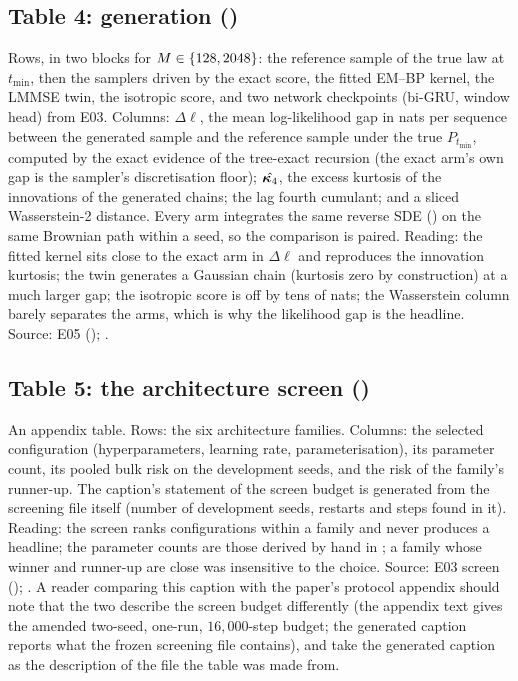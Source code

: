 \subsection{Table 4: generation ()}

Rows, in two blocks for $M\in\{128,2048\}$: the reference sample of the true law at
$t_{\min}$, then the samplers driven by the exact score, the fitted EM--BP kernel, the
LMMSE twin, the isotropic score, and two network checkpoints (bi-GRU, window head) from
E03. Columns: $\Delta\ell$, the mean log-likelihood gap in nats per sequence between the
generated sample and the reference sample under the true $P_{t_{\min}}$, computed by
the exact evidence of the tree-exact recursion (the exact arm's own gap is the sampler's
discretisation floor); $\hat{\bm{\kappa}_4}$, the excess kurtosis of the innovations of the
generated chains; the lag fourth cumulant; and a sliced Wasserstein-2 distance. Every arm
integrates the same reverse SDE () on the same Brownian
path within a seed, so the comparison is paired. Reading: the fitted kernel sits close to
the exact arm in $\Delta\ell$ and reproduces the innovation kurtosis; the twin generates a
Gaussian chain (kurtosis zero by construction) at a much larger gap; the isotropic score
is off by tens of nats; the Wasserstein column barely separates the arms, which is why
the likelihood gap is the headline. Source: E05 ();
.

\subsection{Table 5: the architecture screen ()}

An appendix table. Rows: the six architecture families. Columns: the selected
configuration (hyperparameters, learning rate, parameterisation), its parameter count,
its pooled bulk risk on the development seeds, and the risk of the family's runner-up.
The caption's statement of the screen budget is generated from the screening file
itself (number of development seeds, restarts and steps found in it). Reading: the
screen ranks configurations within a family and never produces a headline; the
parameter counts are those derived by hand in ; a family
whose winner and runner-up are close was insensitive to the choice. Source: E03 screen
(); . A reader
comparing this caption with the paper's protocol appendix should note that the two
describe the screen budget differently (the appendix text gives the amended two-seed,
one-run, $16{,}000$-step budget; the generated caption reports what the frozen screening
file contains), and take the generated caption as the description of the file the
table was made from.

